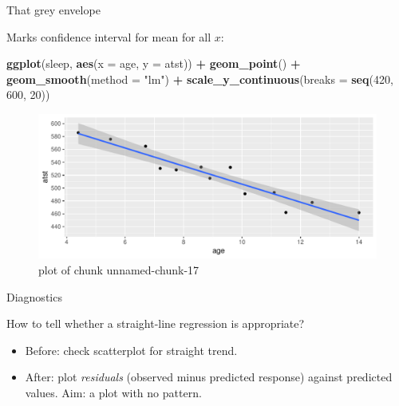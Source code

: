 \documentclass[ignorenonframetext,]{beamer}
\newenvironment{Shaded}{\begin{snugshade}}{\end{snugshade}}
\newcommand{\DataTypeTok}[1]{\textcolor[rgb]{0.13,0.29,0.53}{#1}}
\newcommand{\DecValTok}[1]{\textcolor[rgb]{0.00,0.00,0.81}{#1}}
\newcommand{\KeywordTok}[1]{\textcolor[rgb]{0.13,0.29,0.53}{\textbf{#1}}}
\newcommand{\NormalTok}[1]{#1}
\newcommand{\OperatorTok}[1]{\textcolor[rgb]{0.81,0.36,0.00}{\textbf{#1}}}
\newcommand{\StringTok}[1]{\textcolor[rgb]{0.31,0.60,0.02}{#1}}
\begin{document}
\begin{frame}[fragile]{That grey envelope}
\protect\hypertarget{that-grey-envelope}{}

Marks confidence interval for mean for all \(x\):

\begin{Shaded}
\begin{Highlighting}[]
\KeywordTok{ggplot}\NormalTok{(sleep, }\KeywordTok{aes}\NormalTok{(}\DataTypeTok{x =}\NormalTok{ age, }\DataTypeTok{y =}\NormalTok{ atst)) }\OperatorTok{+}\StringTok{ }\KeywordTok{geom_point}\NormalTok{() }\OperatorTok{+}
\StringTok{  }\KeywordTok{geom_smooth}\NormalTok{(}\DataTypeTok{method =} \StringTok{"lm"}\NormalTok{) }\OperatorTok{+}
\StringTok{  }\KeywordTok{scale_y_continuous}\NormalTok{(}\DataTypeTok{breaks =} \KeywordTok{seq}\NormalTok{(}\DecValTok{420}\NormalTok{, }\DecValTok{600}\NormalTok{, }\DecValTok{20}\NormalTok{))}
\end{Highlighting}
\end{Shaded}

\begin{figure}
\centering
\includegraphics{figure/unnamed-chunk-17-1.pdf}
\caption{plot of chunk unnamed-chunk-17}
\end{figure}

\end{frame}

\begin{frame}{Diagnostics}
\protect\hypertarget{diagnostics}{}

How to tell whether a straight-line regression is appropriate?

\vspace{3ex}

\begin{itemize}
\item
  Before: check scatterplot for straight trend.
\item
  After: plot \emph{residuals} (observed minus predicted response)
  against predicted values. Aim: a plot with no pattern.
\end{itemize}

\end{frame}
\end{document}
